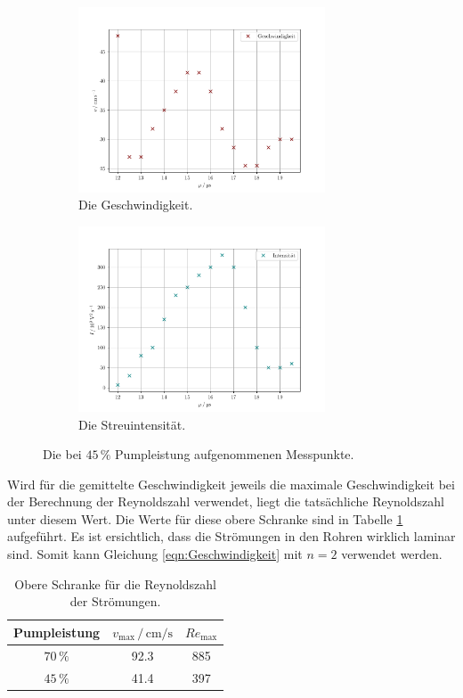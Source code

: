 \begin{figure}
    \centering
    \begin{subfigure}{0.48\textwidth}
        \centering
        \includegraphics[height=5.5cm]{plots/45velocity.pdf}
        \caption{Die Geschwindigkeit.}
        \label{fig:45velo}
    \end{subfigure}
    \begin{subfigure}{0.48\textwidth}
        \centering
        \includegraphics[height=5.5cm]{plots/45intensity.pdf}
        \caption{Die Streuintensität.}
        \label{fig:45inten}
    \end{subfigure}
    \caption{Die bei $45\,\%$ Pumpleistung aufgenommenen Messpunkte.}
    \label{fig:45vi}
\end{figure}

Wird für die gemittelte Geschwindigkeit jeweils die maximale Geschwindigkeit bei der Berechnung der Reynoldszahl verwendet, 
liegt die tatsächliche Reynoldszahl unter diesem Wert. 
Die Werte für diese obere Schranke sind in Tabelle \ref{tab:Reynoldszahl} aufgeführt. 
Es ist ersichtlich, dass die Strömungen in den Rohren wirklich laminar sind. 
Somit kann Gleichung \eqref{eqn:Geschwindigkeit} mit $n=2$ verwendet werden. 
\begin{table}
    \centering
    \caption{Obere Schranke für die Reynoldszahl der Strömungen.}
    \label{tab:Reynoldszahl}
    \begin{tabular}{c c c}
        \toprule
        Pumpleistung & $v_\text{max}\,/\,\si{\centi\meter\per\second}$ & $Re_\text{max}$ \\
        \midrule
        $70\,\%$ & 92.3 & 885 \\
        $45\,\%$ & 41.4 & 397 \\        
        \bottomrule
    \end{tabular}
\end{table}

